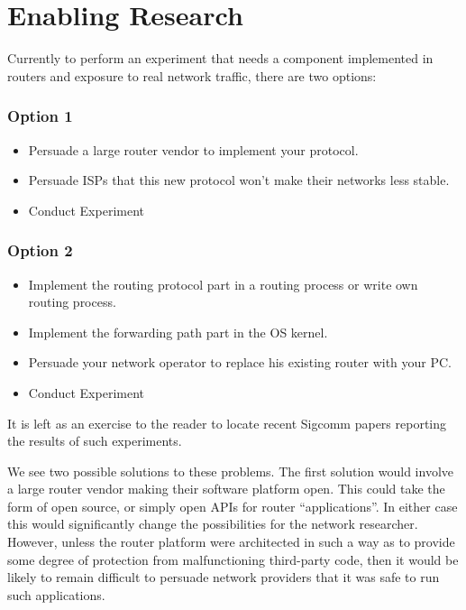 
\section{Enabling Research}


Currently to perform an experiment that needs a component implemented
in routers and exposure to real network traffic, there are two
options:
\vspace{-1.0\baselineskip}
\subsubsection*{Option 1}
\vspace{-0.5\baselineskip}
\begin{itemize}\addtolength{\itemsep}{-0.6\baselineskip}
\item Persuade a large router vendor to implement your protocol.
\item Persuade ISPs that this new protocol won't make their networks
less stable.
\item Conduct Experiment
\end{itemize}
\vspace{-1.5\baselineskip}
\subsubsection*{Option 2}
\vspace{-0.5\baselineskip}
\begin{itemize}\addtolength{\itemsep}{-0.6\baselineskip}
\item Implement the routing protocol part in a routing process or
write own routing process.
\item Implement the forwarding path part in the OS kernel.
\item Persuade your network operator to replace his existing router with
your PC.
\item Conduct Experiment
\end{itemize}

It is left as an exercise to the reader to locate recent Sigcomm
papers reporting the results of such experiments.

We see two possible solutions to these problems.  The first solution
would involve a large router vendor making their software platform
open.  This could take the form of open source, or simply open APIs
for router ``applications''.  In either case this would significantly
change the possibilities for the network researcher.  However, unless
the router platform were architected in such a way as to provide some
degree of protection from malfunctioning third-party code, then it
would be likely to remain difficult to persuade network providers that
it was safe to run such applications.

